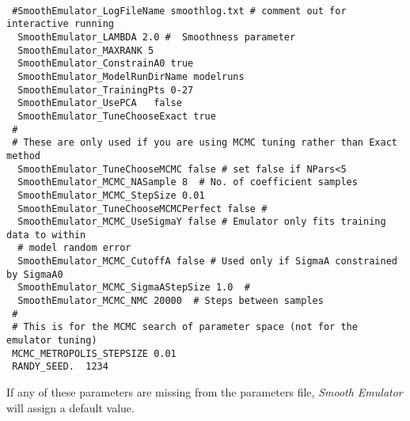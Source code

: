\documentclass[UserManual.tex]{subfiles}
\begin{document}
{\tt
\begin{verbatim}
 #SmoothEmulator_LogFileName smoothlog.txt # comment out for interactive running
  SmoothEmulator_LAMBDA 2.0 #  Smoothness parameter
  SmoothEmulator_MAXRANK 5
  SmoothEmulator_ConstrainA0 true
  SmoothEmulator_ModelRunDirName modelruns
  SmoothEmulator_TrainingPts 0-27
  SmoothEmulator_UsePCA   false
  SmoothEmulator_TuneChooseExact true
 #
 # These are only used if you are using MCMC tuning rather than Exact method
  SmoothEmulator_TuneChooseMCMC false # set false if NPars<5
  SmoothEmulator_MCMC_NASample 8  # No. of coefficient samples
  SmoothEmulator_MCMC_StepSize 0.01
  SmoothEmulator_TuneChooseMCMCPerfect false #
  SmoothEmulator_MCMC_UseSigmaY false # Emulator only fits training data to within
  # model random error
  SmoothEmulator_MCMC_CutoffA false # Used only if SigmaA constrained by SigmaA0
  SmoothEmulator_MCMC_SigmaAStepSize 1.0  #
  SmoothEmulator_MCMC_NMC 20000  # Steps between samples 
 #
 # This is for the MCMC search of parameter space (not for the emulator tuning)
 MCMC_METROPOLIS_STEPSIZE 0.01
 RANDY_SEED.  1234
\end{verbatim}
}
If any of these parameters are missing from the parameters file, {\it Smooth Emulator} will assign a default value.
\end{document}
